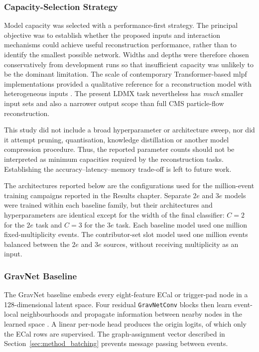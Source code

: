 \subsubsection{Capacity-Selection Strategy}
\label{sec:method_capacity_selection}

Model capacity was selected with a performance-first strategy. The principal
objective was to establish whether the proposed inputs and interaction
mechanisms could achieve useful reconstruction performance, rather than to
identify the smallest possible network. Widths and depths were therefore
chosen conservatively from development runs so that insufficient capacity was
unlikely to be the dominant limitation. The scale of contemporary
Transformer-based \gls{mlpf} implementations provided a qualitative reference
for a reconstruction model with heterogeneous inputs
\cite{pata2026-mlpf}. The present LDMX task nevertheless has \emph{much} smaller input
sets and also a narrower output scope than full CMS particle-flow reconstruction.

This study did not include a broad hyperparameter or architecture sweep, nor
did it attempt pruning, quantisation, knowledge distillation or another model
compression procedure. Thus, the reported parameter counts should not be interpreted as
minimum capacities required by the reconstruction tasks. Establishing the
accuracy--latency--memory trade-off is left to future work.

The architectures reported below are the configurations used for the
million-event training campaigns reported in the Results chapter. Separate
\(2e\) and \(3e\) models were
trained within each baseline family, but their architectures and
hyperparameters are identical except for the width of the final classifier:
\(C=2\) for the \(2e\) task and \(C=3\) for the \(3e\) task. Each baseline
model used one million fixed-multiplicity events. The contributor-set slot
model used one million events balanced between the \(2e\) and \(3e\) sources,
without receiving multiplicity as an input.

\subsubsection{GravNet Baseline}

The GravNet baseline embeds every eight-feature ECal or trigger-pad node in a
128-dimensional latent space. Four residual \texttt{GravNetConv} blocks then
learn event-local neighbourhoods and propagate information between nearby
nodes in the learned space \cite{qasim2019-gravnet}. A linear per-node head
produces the origin logits, of which only the ECal rows are supervised. The
graph-assignment vector described in
Section~\ref{sec:method_batching} prevents message passing between events.

